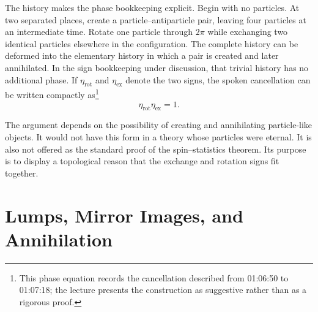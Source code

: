 \begin{classroomqa}
\end{classroomqa}

The history makes the phase bookkeeping explicit. Begin with no particles. At two separated places, create a particle--antiparticle pair, leaving four particles at an intermediate time. Rotate one particle through \(2\pi\) while exchanging two identical particles elsewhere in the configuration. The complete history can be deformed into the elementary history in which a pair is created and later annihilated. In the sign bookkeeping under discussion, that trivial history has no additional phase. If \(\eta_{\mathrm{rot}}\) and \(\eta_{\mathrm{ex}}\) denote the two signs, the spoken cancellation can be written compactly as\footnote{This phase equation records the cancellation described from 01:06:50 to 01:07:18; the lecture presents the construction as suggestive rather than as a rigorous proof.}
\begin{equation}
\eta_{\mathrm{rot}}\eta_{\mathrm{ex}}=1.
\end{equation}

\begin{classroomqa}
\end{classroomqa}

The argument depends on the possibility of creating and annihilating particle-like objects. It would not have this form in a theory whose particles were eternal. It is also not offered as the standard proof of the spin--statistics theorem. Its purpose is to display a topological reason that the exchange and rotation signs fit together.

\section{Lumps, Mirror Images, and Annihilation}

